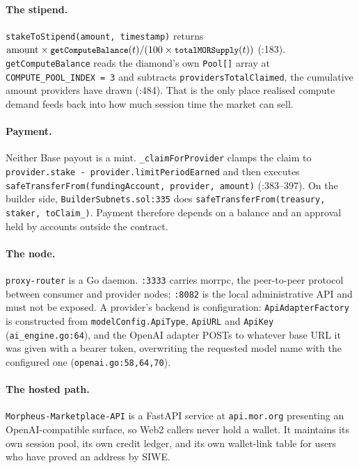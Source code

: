 \documentclass[11pt,a4paper]{article}
\newcommand{\code}[1]{\texttt{\small #1}}
\begin{document}
\paragraph{The stipend.} \code{stakeToStipend(amount, timestamp)} returns
$\text{amount} \times \code{getComputeBalance}(t) / (100 \times
\code{totalMORSupply}(t))$ (:183). \code{getComputeBalance} reads the diamond's
own \code{Pool[]} array at \code{COMPUTE\_POOL\_INDEX = 3} and subtracts
\code{providersTotalClaimed}, the cumulative amount providers have drawn (:484).
That is the only place realised compute demand feeds back into how much session
time the market can sell.

\paragraph{Payment.} Neither Base payout is a mint. \code{\_claimForProvider}
clamps the claim to \code{provider.stake - provider.limitPeriodEarned} and then
executes \code{safeTransferFrom(fundingAccount, provider, amount)} (:383--397).
On the builder side, \code{BuilderSubnets.sol:335} does
\code{safeTransferFrom(treasury, staker, toClaim\_)}. Payment therefore depends
on a balance and an approval held by accounts outside the contract.

\paragraph{The node.} \code{proxy-router} is a Go daemon. \code{:3333} carries
morrpc, the peer-to-peer protocol between consumer and provider nodes;
\code{:8082} is the local administrative API and must not be exposed. A
provider's backend is configuration: \code{ApiAdapterFactory} is constructed from
\code{modelConfig.ApiType}, \code{ApiURL} and \code{ApiKey}
(\code{ai\_engine.go:64}), and the OpenAI adapter POSTs to whatever base URL it
was given with a bearer token, overwriting the requested model name with the
configured one (\code{openai.go:58,64,70}).

\paragraph{The hosted path.} \code{Morpheus-Marketplace-API} is a FastAPI
service at \code{api.mor.org} presenting an OpenAI-compatible surface, so Web2
callers never hold a wallet. It maintains its own session pool, its own
credit ledger, and its own wallet-link table for users who have proved an
address by SIWE.
\end{document}
